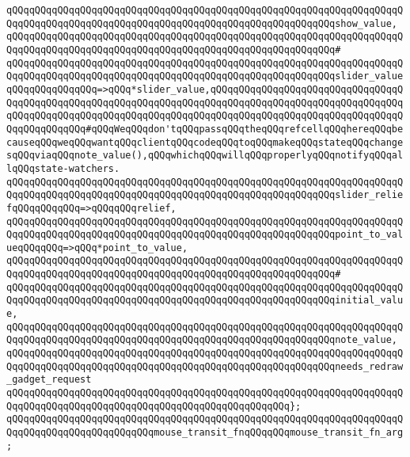 \verb|qQQqqQQqqQQqqQQqqQQqqQQqqQQqqQQqqQQqqQQqqQQqqQQqqQQqqQQqqQQqqQQqqQQqqQQqqQQqqQQqqQQqqQQqqQQqqQQqqQQqqQQqqQQqqQQqqQQqqQQqqQQqqQQqshow_value,|\newline
\verb|qQQqqQQqqQQqqQQqqQQqqQQqqQQqqQQqqQQqqQQqqQQqqQQqqQQqqQQqqQQqqQQqqQQqqQQqqQQqqQQqqQQqqQQqqQQqqQQqqQQqqQQqqQQqqQQqqQQqqQQqqQQqqQQq#|\newline
\verb|qQQqqQQqqQQqqQQqqQQqqQQqqQQqqQQqqQQqqQQqqQQqqQQqqQQqqQQqqQQqqQQqqQQqqQQqqQQqqQQqqQQqqQQqqQQqqQQqqQQqqQQqqQQqqQQqqQQqqQQqqQQqqQQqslider_valueqQQqqQQqqQQqqQQq=>qQQq*slider_value,qQQqqQQqqQQqqQQqqQQqqQQqqQQqqQQqqQQqqQQqqQQqqQQqqQQqqQQqqQQqqQQqqQQqqQQqqQQqqQQqqQQqqQQqqQQqqQQqqQQqqQQqqQQqqQQqqQQqqQQqqQQqqQQqqQQqqQQqqQQqqQQqqQQqqQQqqQQqqQQqqQQqqQQqqQQqqQQqqQQqqQQqqQQq#qQQqWeqQQqdon'tqQQqpassqQQqtheqQQqrefcellqQQqhereqQQqbecauseqQQqweqQQqwantqQQqclientqQQqcodeqQQqtoqQQqmakeqQQqstateqQQqchangesqQQqviaqQQqnote_value(),qQQqwhichqQQqwillqQQqproperlyqQQqnotifyqQQqallqQQqstate-watchers.|\newline
\verb|qQQqqQQqqQQqqQQqqQQqqQQqqQQqqQQqqQQqqQQqqQQqqQQqqQQqqQQqqQQqqQQqqQQqqQQqqQQqqQQqqQQqqQQqqQQqqQQqqQQqqQQqqQQqqQQqqQQqqQQqqQQqqQQqslider_reliefqQQqqQQqqQQq=>qQQqqQQqrelief,|\newline
\verb|qQQqqQQqqQQqqQQqqQQqqQQqqQQqqQQqqQQqqQQqqQQqqQQqqQQqqQQqqQQqqQQqqQQqqQQqqQQqqQQqqQQqqQQqqQQqqQQqqQQqqQQqqQQqqQQqqQQqqQQqqQQqqQQqpoint_to_valueqQQqqQQq=>qQQq*point_to_value,|\newline
\verb|qQQqqQQqqQQqqQQqqQQqqQQqqQQqqQQqqQQqqQQqqQQqqQQqqQQqqQQqqQQqqQQqqQQqqQQqqQQqqQQqqQQqqQQqqQQqqQQqqQQqqQQqqQQqqQQqqQQqqQQqqQQqqQQq#|\newline
\verb|qQQqqQQqqQQqqQQqqQQqqQQqqQQqqQQqqQQqqQQqqQQqqQQqqQQqqQQqqQQqqQQqqQQqqQQqqQQqqQQqqQQqqQQqqQQqqQQqqQQqqQQqqQQqqQQqqQQqqQQqqQQqqQQqinitial_value,|\newline
\verb|qQQqqQQqqQQqqQQqqQQqqQQqqQQqqQQqqQQqqQQqqQQqqQQqqQQqqQQqqQQqqQQqqQQqqQQqqQQqqQQqqQQqqQQqqQQqqQQqqQQqqQQqqQQqqQQqqQQqqQQqqQQqqQQqnote_value,|\newline
\verb|qQQqqQQqqQQqqQQqqQQqqQQqqQQqqQQqqQQqqQQqqQQqqQQqqQQqqQQqqQQqqQQqqQQqqQQqqQQqqQQqqQQqqQQqqQQqqQQqqQQqqQQqqQQqqQQqqQQqqQQqqQQqqQQqneeds_redraw_gadget_request|\newline
\verb|qQQqqQQqqQQqqQQqqQQqqQQqqQQqqQQqqQQqqQQqqQQqqQQqqQQqqQQqqQQqqQQqqQQqqQQqqQQqqQQqqQQqqQQqqQQqqQQqqQQqqQQqqQQqqQQqqQQqqQQq};|\newline
\newline
\verb|qQQqqQQqqQQqqQQqqQQqqQQqqQQqqQQqqQQqqQQqqQQqqQQqqQQqqQQqqQQqqQQqqQQqqQQqqQQqqQQqqQQqqQQqqQQqqQQqmouse_transit_fnqQQqqQQqmouse_transit_fn_arg;|\newline
